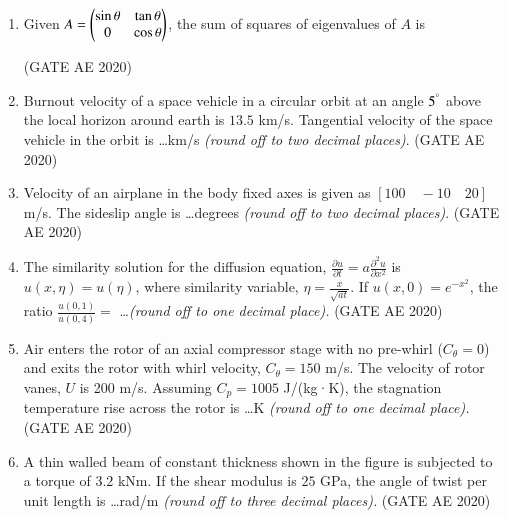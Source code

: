 \documentclass[journal,12pt,onecolumn]{IEEEtran}
\theoremstyle{remark}
\begin{document}
\begin{enumerate}
\item Given $A = \begin{pmatrix} \sin\theta & \tan\theta \\ 0 & \cos\theta \end{pmatrix}$, the sum of squares of eigenvalues of $A$ is
\begin{enumerate}
\end{enumerate}
\hfill(GATE AE 2020)

\item Burnout velocity of a space vehicle in a circular orbit at an angle $5^\degree$ above the local horizon around earth is $13.5$ km/s. Tangential velocity of the space vehicle in the orbit is \dots km/s \textit{(round off to two decimal places)}.
\hfill(GATE AE 2020)

\item Velocity of an airplane in the body fixed axes is given as $[100 \quad -10 \quad 20]$ m/s. The sideslip angle is \dots degrees \textit{(round off to two decimal places)}.
\hfill(GATE AE 2020)

\item The similarity solution for the diffusion equation, 
$
\frac{\partial u}{\partial t} = a \frac{\partial^2 u}{\partial x^2}
$
is $u(x, \eta) = u(\eta)$, where similarity variable, $\eta = \frac{x}{\sqrt{a t}}$. If $u(x, 0) = e^{-x^2}$, the ratio $\frac{u(0, 1)}{u(0, 4)} =$ \dots \textit{(round off to one decimal place).}
\hfill(GATE AE 2020)

\item Air enters the rotor of an axial compressor stage with no pre-whirl ($C_{\theta} = 0$) and exits the rotor with whirl velocity, $C_{\theta} = 150$ m/s. The velocity of rotor vanes, $U$ is 200 m/s. Assuming $C_p = 1005$ J/(kg·K), the stagnation temperature rise across the rotor is \dots K \textit{(round off to one decimal place).}
\hfill(GATE AE 2020)

\item A thin walled beam of constant thickness shown in the figure is subjected to a torque of $3.2$ kNm. If the shear modulus is $25$ GPa, the angle of twist per unit length is \dots rad/m \textit{(round off to three decimal places).}
\hfill(GATE AE 2020)


\end{enumerate}
\end{document}
